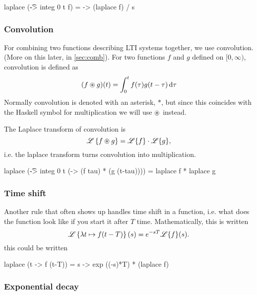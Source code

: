 \begin{codeeq}
laplace (\t -> integ 0 t f) = \s -> (laplace f) / s 
\end{codeeq}
\subsubsection{Convolution}\label{sec:convol} 
For combining two functions describing LTI systems together, we use convolution. (More on this later, in \ref{sec:comb}).
For two functions $f$ and $g$ defined on $[0,\infty)$, convolution is defined as
\begin{equation*}
    (f \circledast g)(t) = \int_0^t f(\tau) g(t-\tau) \, \dd\tau 
\end{equation*}
Normally convolution is denoted with an asterisk, $\ast$, but since this coincides with the Haskell symbol for multiplication we will use $\circledast$ instead.

The Laplace transform of convolution is 
\begin{equation*}
    \mathscr{L} \left\{f\circledast g\right\} = \mathscr{L}\{f\} \cdot \mathscr{L}\{g\}, 
\end{equation*}
i.e. the laplace transform turns convolution into multiplication. 

\begin{codeeq}
laplace (\t -> integ 0 t (\tau-> (f tau) * (g (t-tau)))) = 
    laplace f * laplace g 
\end{codeeq} 



\subsubsection{Time shift} 
 Another rule that often shows up handles time shift in a function, i.e. what does the function look like if you start it after $T$ time. Mathematically, this is written
 \begin{equation*}
     \mathscr{L} \left\{\lambda t\mapsto f(t-T)\right\}(s) = e^{-sT} \mathscr{L} \{f\}(s).
 \end{equation*}
this could be written %
\begin{codeeq}
laplace (t -> f (t-T)) = s -> exp ((-s)*T) * (laplace f)
\end{codeeq} %

\subsubsection{Exponential decay} 

